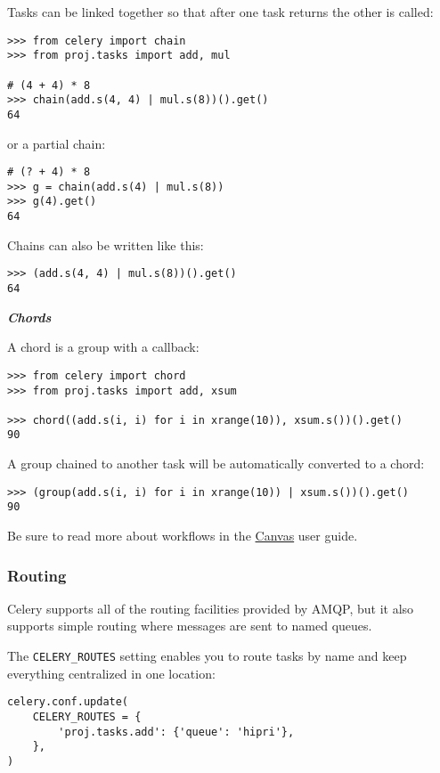 \documentclass[9pt,a4paper]{article}
\begin{document}
\begin{CJK*}{GBK}{kai}
Tasks can be linked together so that after one task returns the other is called:

\begin{Verbatim}[frame=single]
>>> from celery import chain
>>> from proj.tasks import add, mul

# (4 + 4) * 8
>>> chain(add.s(4, 4) | mul.s(8))().get()
64
\end{Verbatim}

or a partial chain:

\begin{Verbatim}[frame=single]
# (? + 4) * 8
>>> g = chain(add.s(4) | mul.s(8))
>>> g(4).get()
64
\end{Verbatim}

Chains can also be written like this:

\begin{Verbatim}[frame=single]
>>> (add.s(4, 4) | mul.s(8))().get()
64
\end{Verbatim}

\textit{\textbf{Chords}}

A chord is a group with a callback:

\begin{Verbatim}[frame=single]
>>> from celery import chord
>>> from proj.tasks import add, xsum

>>> chord((add.s(i, i) for i in xrange(10)), xsum.s())().get()
90
\end{Verbatim}

A group chained to another task will be automatically converted to a chord:

\begin{Verbatim}[frame=single]
>>> (group(add.s(i, i) for i in xrange(10)) | xsum.s())().get()
90
\end{Verbatim}

Be sure to read more about workflows in the \href{http://docs.celeryproject.org/en/latest/userguide/canvas.html#guide-canvas}{Canvas} user guide.

\subsubsection{Routing}
Celery supports all of the routing facilities provided by AMQP, but it also supports simple routing where messages are sent to named queues.

The \verb"CELERY_ROUTES" setting enables you to route tasks by name and keep everything centralized in one location:

\begin{Verbatim}[frame=single]
celery.conf.update(
    CELERY_ROUTES = {
        'proj.tasks.add': {'queue': 'hipri'},
    },
)
\end{Verbatim}


\end{CJK*}
\end{document}

